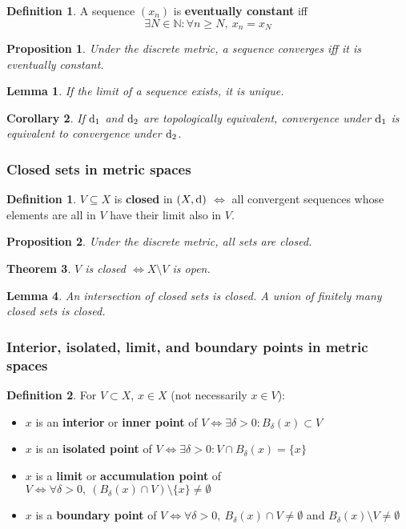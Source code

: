 \documentclass[12pt]{article}
\newtheorem{thm}{Theorem}[section]
\newtheorem{lem}[thm]{Lemma}
\newtheorem{cor}[thm]{Corollary}
\newtheorem*{prop*}{Proposition}
\theoremstyle{definition}
\newtheorem{defn}{Definition}[section]
\newtheorem*{defn*}{Definition}
\renewcommand{\d}{{\textnormal{d}}}
\begin{document}
\begin{defn*}
	A sequence $(x_n)$ is \textbf{eventually constant} iff
	$$\exists N \in \mathbb{N} : \forall n \geq N,\ x_n = x_N$$
\end{defn*}

\begin{prop*}
	Under the discrete metric, a sequence converges iff it is eventually constant.
\end{prop*}

\begin{lem}
	If the limit of a sequence exists, it is unique.
\end{lem}

\begin{cor}
	If $\d_1$ and $\d_2$ are topologically equivalent, convergence under $\d_1$ is equivalent to convergence under $\d_2$.
\end{cor}

\subsubsection{Closed sets in metric spaces}

\begin{defn}
	$V \subseteq X$ is \textbf{closed} in $(X, \d)$ $\iff$ all convergent sequences whose elements are all in $V$ have their limit also in $V$.
\end{defn}

\begin{prop*}
	Under the discrete metric, all sets are closed.
\end{prop*}

\begin{thm}
	$V$ is closed $\iff X \setminus V$ is open.
\end{thm}

\begin{lem}
	An intersection of closed sets is closed.
	A union of finitely many closed sets is closed.
\end{lem}

\subsubsection{Interior, isolated, limit, and boundary points in metric spaces}

\begin{defn}
	For $V \subset X$, $x \in X$ (not necessarily $x \in V$):
	\begin{itemize}
		\item $x$ is an \textbf{interior} or \textbf{inner point} of $V \iff \exists \delta > 0 : B_{\delta}(x) \subset V$ 
		\item $x$ is an \textbf{isolated point} of $V \iff \exists \delta > 0 : V \cap B_{\delta}(x) = \{x\}$
		\item $x$ is a \textbf{limit} or \textbf{accumulation point} of $V \iff \forall \delta > 0,\ (B_{\delta}(x) \cap V) \setminus \{x\} \neq \emptyset$
		\item $x$ is a \textbf{boundary point} of $V \iff \forall \delta > 0,\ B_{\delta}(x) \cap V \neq \emptyset$ and $B_{\delta}(x) \setminus V \neq \emptyset$
	\end{itemize}
\end{defn}
\end{document}

